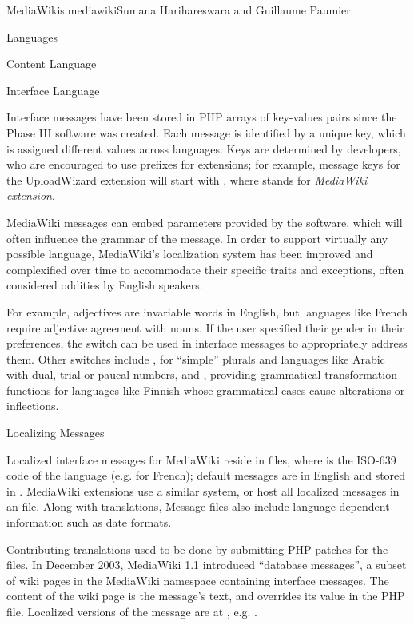 \begin{aosachapter}{MediaWiki}{s:mediawiki}{Sumana Harihareswara and Guillaume Paumier}
\begin{aosasect1}{Languages}
\begin{aosasect2}{Content Language}
\end{aosasect2}

\begin{aosasect2}{Interface Language}

Interface messages have been stored in PHP arrays of key-values pairs
since the Phase III software was created. Each message is identified
by a unique key, which is assigned different values across
languages. Keys are determined by developers, who are encouraged to
use prefixes for extensions; for example, message keys for the
UploadWizard extension will start with , where
 stands for \emph{MediaWiki extension}.

MediaWiki messages can embed parameters provided by the software,
which will often influence the grammar of the message. In order to
support virtually any possible language, MediaWiki's localization
system has been improved and complexified over time to accommodate
their specific traits and exceptions, often considered oddities by
English speakers.

For example, adjectives are invariable words in English, but languages
like French require adjective agreement with nouns. If the user
specified their gender in their preferences, the 
switch can be used in interface messages to appropriately address
them. Other switches include , for ``simple'' plurals
and languages like Arabic with dual, trial or paucal numbers, and
, providing grammatical transformation functions
for languages like Finnish whose grammatical cases cause alterations
or inflections.

\end{aosasect2}

\begin{aosasect2}{Localizing Messages}

Localized interface messages for MediaWiki reside in
 files, where  is the ISO-639 code of
the language (e.g.  for French); default messages
are in English and stored in . MediaWiki
extensions use a similar system, or host all localized messages in an
 file. Along
with translations, Message files also include language-dependent
information such as date formats.

Contributing translations used to be done by submitting PHP patches
for the  files. In December 2003, MediaWiki 1.1
introduced ``database messages'', a subset of wiki pages in the
MediaWiki namespace containing interface messages. The content of the
wiki page  is the
message's text, and overrides its value in the PHP file. Localized
versions of the message are at
,
e.g. .


\end{aosasect2}
\end{aosasect1}
\end{aosachapter}
